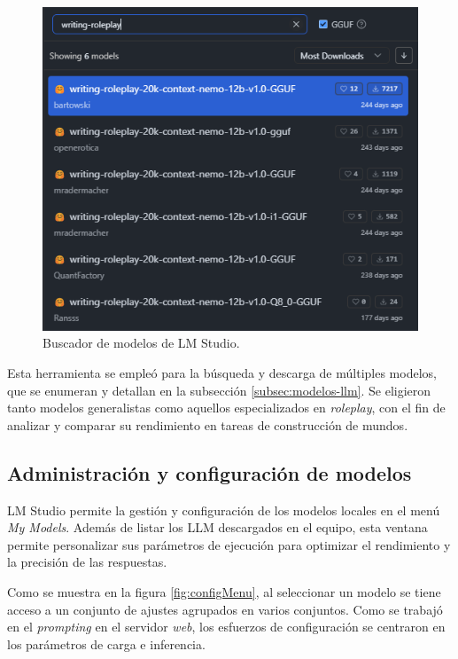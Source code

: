 \begin{figure}[htbp]
	\centering
	\includegraphics[width=0.8 \textwidth]{./Figures/download_menu.png}
	\caption{Buscador de modelos de LM Studio.}
	\label{fig:downloadMenu}
\end{figure}

Esta herramienta se empleó para la búsqueda y descarga de múltiples modelos,
que se enumeran y detallan en la subsección \ref{subsec:modelos-llm}.
Se eligieron tanto modelos generalistas como aquellos especializados en \textit{roleplay},
con el fin de analizar y comparar su rendimiento en tareas de construcción de mundos.

\subsection{Administración y configuración de modelos}
LM Studio permite la gestión y configuración de los modelos locales en el menú \textit{My Models}.
Además de listar los LLM descargados en el equipo, esta ventana permite personalizar
sus parámetros de ejecución para optimizar el rendimiento y la precisión de las respuestas.

\pagebreak
Como se muestra en la figura \ref{fig:configMenu},
al seleccionar un modelo se tiene acceso a un conjunto de ajustes agrupados
en varios conjuntos.
Como se trabajó en el \textit{prompting} en el servidor \textit{web},
los esfuerzos de configuración se centraron en los parámetros de carga e inferencia.

